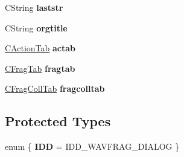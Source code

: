 \begin{DoxyCompactItemize}
\item 
\hypertarget{class_c_wavfrag_dlg_a6a1d1f2d7711c9e616d6da8b80f07b34}{C\-String {\bfseries laststr}}\label{class_c_wavfrag_dlg_a6a1d1f2d7711c9e616d6da8b80f07b34}

\item 
\hypertarget{class_c_wavfrag_dlg_a8cb727027ec6d07d1abd495acc9151e1}{C\-String {\bfseries orgtitle}}\label{class_c_wavfrag_dlg_a8cb727027ec6d07d1abd495acc9151e1}

\item 
\hypertarget{class_c_wavfrag_dlg_af30e2af350c9a42809b7f7ddc290c3b5}{\hyperlink{class_c_action_tab}{C\-Action\-Tab} {\bfseries actab}}\label{class_c_wavfrag_dlg_af30e2af350c9a42809b7f7ddc290c3b5}

\item 
\hypertarget{class_c_wavfrag_dlg_a6bb5183e755def42e123f23555e35792}{\hyperlink{class_c_frag_tab}{C\-Frag\-Tab} {\bfseries fragtab}}\label{class_c_wavfrag_dlg_a6bb5183e755def42e123f23555e35792}

\item 
\hypertarget{class_c_wavfrag_dlg_a3cfd7bd379411b64de38dfa5354c17be}{\hyperlink{class_c_frag_coll_tab}{C\-Frag\-Coll\-Tab} {\bfseries fragcolltab}}\label{class_c_wavfrag_dlg_a3cfd7bd379411b64de38dfa5354c17be}

\end{DoxyCompactItemize}
\subsection*{Protected Types}
\begin{DoxyCompactItemize}
\item 
enum \{ {\bfseries I\-D\-D} =  I\-D\-D\-\_\-\-W\-A\-V\-F\-R\-A\-G\-\_\-\-D\-I\-A\-L\-O\-G
 \}
\end{DoxyCompactItemize}
